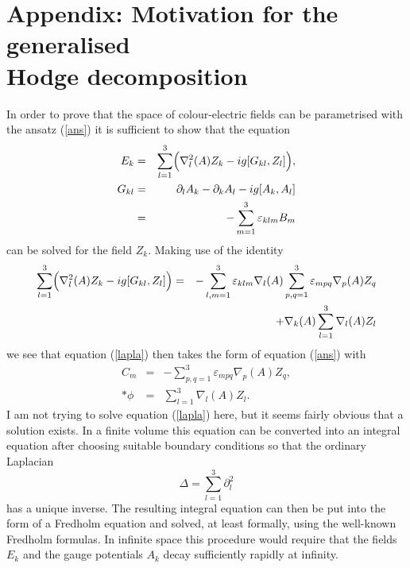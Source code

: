 \documentclass[a4paper,12pt]{article}
\begin{document}
\section*{Appendix: Motivation for the generalised \\ Hodge decomposition}
In order to prove that the space of colour-electric fields can be parametrised with the ansatz (\ref{ans}) it is sufficient to show that the equation
\begin{eqnarray} \label{lapla}
E_k &=& \sum_{l=1}^3 \Bigl( \nabla_l^2(A) Z_k - ig [G_{kl},Z_l] \Bigr), \\
G_{kl} &=& \partial_l A_k - \partial_k A_l - ig [A_k,A_l] \nonumber \\*
 &=& - \sum_{m=1}^3 \varepsilon_{klm} B_m \nonumber
\end{eqnarray}
can be solved for the field $Z_k$. Making use of the identity
\begin{eqnarray*}
\sum_{l=1}^3 \Bigl( \nabla_l^2(A) Z_k - ig [G_{kl},Z_l] \Bigr) &=& - \sum_{l,m=1}^3 \varepsilon_{klm} \nabla_l(A) \sum_{p,q=1}^3 \varepsilon_{mpq} \nabla_p(A) Z_q \\*
&& + \nabla_k(A) \sum_{l=1}^3 \nabla_l(A) Z_l
\end{eqnarray*}
we see that equation (\ref{lapla}) then takes the form of equation (\ref{ans}) with
\begin{eqnarray} 
C_m &=& - \sum_{p,q=1}^3 \varepsilon_{mpq} \nabla_p(A) Z_q, \label{konst1} \\*
\phi &=& \sum_{l=1}^3 \nabla_l(A) Z_l. \label{konst2}
\end{eqnarray}
I am not trying to solve equation (\ref{lapla}) here, but it seems fairly obvious that a solution exists. In a finite volume this equation can be converted into an integral equation after choosing suitable boundary conditions so that the ordinary Laplacian 
$$\Delta = \sum_{l=1}^3 \partial_l^2$$
has a unique inverse. The resulting integral equation can then be put into the form of a Fredholm equation and solved, at least formally, using the well-known Fredholm formulas. In  infinite space this procedure would require that the fields $E_k$ and the gauge potentials $A_k$ decay sufficiently rapidly at infinity. 
\end{document}
